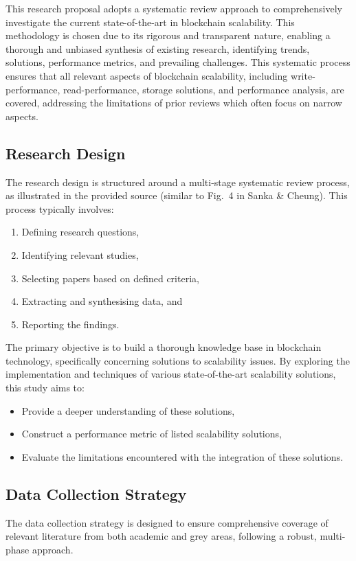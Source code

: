 
This research proposal adopts a systematic review approach to comprehensively investigate the current state-of-the-art in blockchain scalability. This methodology is chosen due to its rigorous and transparent nature, enabling a thorough and unbiased synthesis of existing research, identifying trends, solutions, performance metrics, and prevailing challenges. This systematic process ensures that all relevant aspects of blockchain scalability, including write-performance, read-performance, storage solutions, and performance analysis, are covered, addressing the limitations of prior reviews which often focus on narrow aspects.

\subsection{Research Design}
The research design is structured around a multi-stage systematic review process, as illustrated in the provided source (similar to Fig.~4 in Sanka \& Cheung). This process typically involves:
\begin{enumerate}
    \item Defining research questions,
    \item Identifying relevant studies,
    \item Selecting papers based on defined criteria,
    \item Extracting and synthesising data, and
    \item Reporting the findings.
\end{enumerate}

The primary objective is to build a thorough knowledge base in blockchain technology, specifically concerning solutions to scalability issues. By exploring the implementation and techniques of various state-of-the-art scalability solutions, this study aims to:
\begin{itemize}
    \item Provide a deeper understanding of these solutions,
    \item Construct a performance metric of listed scalability solutions,
    \item Evaluate the limitations encountered with the integration of these solutions.
\end{itemize}

\subsection{Data Collection Strategy}
The data collection strategy is designed to ensure comprehensive coverage of relevant literature from both academic and grey areas, following a robust, multi-phase approach.

